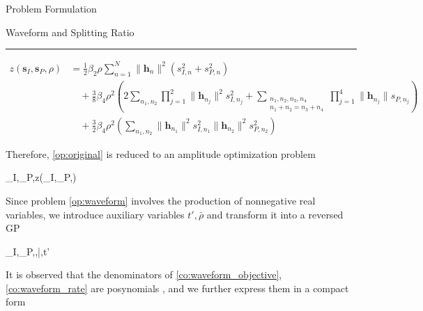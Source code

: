 \documentclass{IEEEtran}
\begin{document}
\begin{section}{Problem Formulation}
\begin{subsection}{Waveform and Splitting Ratio}
\begin{equation}
		\end{equation}
		\begin{figure*}[b]
			\hrule
			\begin{equation}\label{eq:z_waveform}
				\begin{split}
					z(\boldsymbol{s}_I,\boldsymbol{s}_P,\rho)
					& = \frac{1}{2}{\beta_2}{\rho} \sum_{n=1}^N \lVert{\boldsymbol{h}_n}\rVert^2(s_{I,n}^2+s_{P,n}^2)\\
					& \quad + \frac{3}{8}{\beta_4}{\rho^2} \left( 2\sum_{n_1,n_2} \prod_{j=1}^2 \lVert{\boldsymbol{h}_{n_j}}\rVert^2 s_{I,{n_j}}^2 + \sum_{\substack{{n_1},{n_2},{n_3},{n_4}\\{n_1}+{n_2}={n_3}+{n_4}}} \prod_{j=1}^4 \lVert{\boldsymbol{h}_{n_j}}\rVert s_{P,{n_j}} \right)\\
					& \quad + \frac{3}{2}{\beta_4}{\rho^2} \left( \sum_{n_1,n_2} \lVert{\boldsymbol{h}_{n_1}}\rVert^2 s_{I,{n_1}}^2 \lVert{\boldsymbol{h}_{n_2}}\rVert^2 s_{P,{n_2}}^2 \right)
				\end{split}
			\end{equation}
		\end{figure*}
		Therefore, \ref{op:original} is reduced to an amplitude optimization problem
		\begin{maxi!}
			{\boldsymbol{s}_I,_P,\rho}{z(\boldsymbol{s}_I,_P,\rho)}{\label{op:waveform}}{}
		\end{maxi!}
		Since problem \ref{op:waveform} involves the production of nonnegative real variables, we introduce auxiliary variables $t',\bar{\rho}$ and transform it into a reversed GP
		\begin{mini!}
			{\boldsymbol{s}_I,_P,\rho,\bar{\rho},t'}{}{\label{op:waveform_rgp}}{}
			\label{co:waveform_power}
			\label{co:waveform_objective}
			\label{co:waveform_rate}
		\end{mini!}
		It is observed that the denominators of \ref{co:waveform_objective}, \ref{co:waveform_rate} are posynomials \cite{Boyd2007}, and we further express them in a compact form

\end{subsection}
\end{section}
\end{document}
